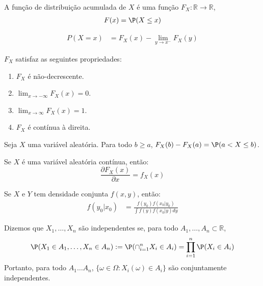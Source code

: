 \begin{definition}
 \label{cdf}
 A função de distribuição acumulada de $X$ é uma função $F_{X}: \mathbb{R} \rightarrow \mathbb{R}$,
 \begin{align*}
  F(x) = \P(X \leq x)
 \end{align*}
\end{definition}

\begin{lemma}
 \begin{align*}
  P(X=x)	&= F_{X}(x) - \lim_{y \rightarrow x^{-}}F_{X}(y)
 \end{align*}
\end{lemma}
     
\begin{lemma}
 $F_{X}$ satisfaz as seguintes propriedades:
 \begin{enumerate}
  \item $F_{X}$ é não-decrescente.
	\item $\lim_{x \rightarrow -\infty}F_{X}(x) = 0$.
	\item $\lim_{x \rightarrow \infty}F_{X}(x) = 1$.
	\item $F_{X}$ é contínua à direita.
 \end{enumerate}
\end{lemma}
	
\begin{lemma}
 Seja $X$ uma variável aleatória. Para todo $b \geq a$, $F_{X}(b)-F_{X}(a) = \P(a < X \leq b)$.
\end{lemma}

\begin{lemma}
 \label{cdf-derivative}
 Se $X$ é uma variável aleatória contínua, então:
 \[ \frac{\partial F_{X}(x)}{\partial x} = f_{X}(x) \]
\end{lemma}

\begin{theorem}
 \label{bayes-va}
 Se $X$ e $Y$ tem densidade conjunta $f(x,y)$, então:
 \begin{align*}
  f(y_{0}|x_{0})	&= \frac{f(y_{0})f(x_{0}|y_{0})}{\int{f(y)f(x_{0}|y)dy}}
 \end{align*}
\end{theorem}

\begin{definition}
 \label{def::independence}
 Dizemos que $X_{1}, \ldots, X_{n}$ são independentes se, para todo $A_{1}, \ldots, A_{n} \subset \mathbb{R}$,
 \[ \P(X_{1} \in A_{1},\ldots,X_{n} \in A_{n}) := \P(\cap_{i=1}^{n}{X_{i} \in A_{i}}) = \prod_{i=1}^{n}{\P(X_{i} \in A_{i})} \] 
 Portanto, para todo $A_{1} \ldots A_{n}$, $\{\omega \in \Omega : X_{i}(\omega) \in A_{i}\}$ são conjuntamente independentes.
\end{definition}

